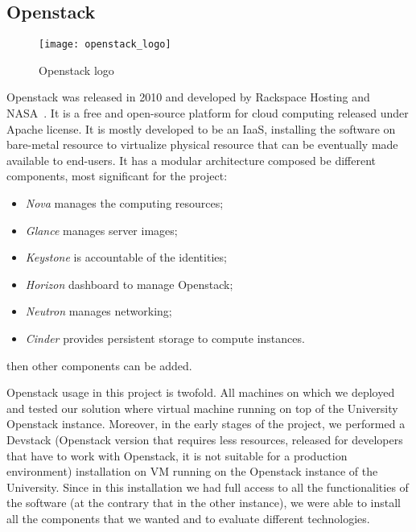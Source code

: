 \subsection{Openstack}
\begin{figure}[t]
  \centering \texttt{[image: openstack\_logo]}
  \caption{Openstack logo}
  \label{chap:prjan:img:openstack_logo}
\end{figure}
Openstack was released in 2010 and developed by Rackspace Hosting and
NASA~\cite{openstackWebsite}. It is a free and open-source platform for cloud
computing released under Apache license. It is mostly developed to be an IaaS,
installing the software on bare-metal resource to virtualize physical resource
that can be eventually made available to end-users. It has a modular
architecture composed be different components, most significant for the project:
\begin{itemize}
\item \emph{Nova} manages the computing resources;
\item \emph{Glance} manages server images;
\item \emph{Keystone} is accountable of the identities;
\item \emph{Horizon} dashboard to manage Openstack;
\item \emph{Neutron} manages networking;
\item \emph{Cinder} provides persistent storage to compute instances.
\end{itemize}
then other components can be added.

Openstack usage in this project is twofold. All machines on which we deployed
and tested our solution where virtual machine running on top of the University
Openstack instance. Moreover, in the early stages of the project, we performed
a Devstack (Openstack version that requires less resources, released for
developers that have to work with Openstack, it is not suitable for a production
environment) installation on VM running on the Openstack instance of
the University. Since in this installation we had full access to all the
functionalities of the software (at the contrary that in the other instance), we
were able to install all the components that we wanted and to evaluate different
technologies.


